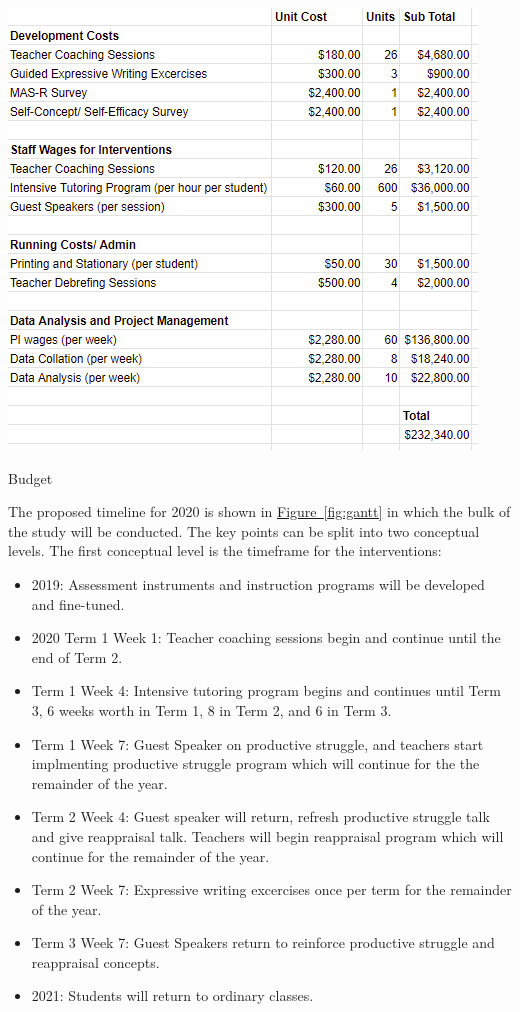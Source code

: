 \documentclass[14pt]{memoir}
\newcommand{\reffig}[1]{\hyperref[fig:#1]{Figure~\ref{fig:#1}}}
\begin{document}
\begin{table}[p]
\begin{center}
\includegraphics[scale=1.2]{Budget.PNG}
\end{center}
\caption{Budget \label{tab:budget}}
\end{table}

The proposed timeline for 2020 is shown in \reffig{gantt} in which the bulk of the study will be conducted. The key points can be split into two conceptual levels. The first conceptual level is the timeframe for the interventions:
\begin{itemize}
	\item 2019: Assessment instruments and instruction programs will be developed and fine-tuned.
	\item 2020 Term 1 Week 1: Teacher coaching sessions begin and continue until the end of Term 2.
	\item Term 1 Week 4: Intensive tutoring program begins and continues until Term 3, 6 weeks worth in Term 1, 8 in Term 2, and 6 in Term 3.
	\item Term 1 Week 7: Guest Speaker on productive struggle, and teachers start implmenting productive struggle program which will continue for the the remainder of the year. 
	\item Term 2 Week 4: Guest speaker will return, refresh productive struggle talk and give reappraisal talk. Teachers will begin reappraisal program which will continue for the remainder of the year.
	\item Term 2 Week 7: Expressive writing excercises once per term for the remainder of the year.
	\item Term 3 Week 7: Guest Speakers return to reinforce productive struggle and reappraisal concepts.
	\item 2021: Students will return to ordinary classes.
\end{itemize}
\end{document}
